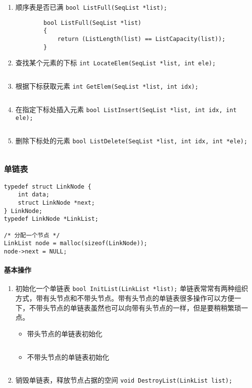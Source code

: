 \documentclass{ctexart}
\begin{document}
\begin{enumerate}
    \item 顺序表是否已满 \texttt{bool ListFull(SeqList *list);}
        \begin{verbatim}
        bool ListFull(SeqList *list)
        {
            return (ListLength(list) == ListCapacity(list));
        }
        \end{verbatim}

    \item 查找某个元素的下标 \texttt{int LocateElem(SeqList *list, int ele);}
        \inputminted{c}{codes/locate-element-in-static-list.c}

    \item 根据下标获取元素 \texttt{int GetElem(SeqList *list, int idx);}
        \inputminted{c}{codes/get-element-from-static-list.c}

    \item 在指定下标处插入元素 \texttt{bool ListInsert(SeqList *list, int idx, int ele);}
        \inputminted{c}{codes/static-list-insert.c}

    \item 删除下标处的元素 \texttt{bool ListDelete(SeqList *list, int idx, int *ele);}
        \inputminted{c}{codes/static-list-delete.c}
\end{enumerate}

\subsubsection{单链表}
\begin{verbatim}
typedef struct LinkNode {
    int data;
    struct LinkNode *next;
} LinkNode;
typedef LinkNode *LinkList;

/* 分配一个节点 */
LinkList node = malloc(sizeof(LinkNode));
node->next = NULL;
\end{verbatim}

\paragraph{基本操作}
\begin{enumerate}
    \item 初始化一个单链表 \texttt{bool InitList(LinkList *list);}
        单链表常常有两种组织方式，带有头节点和不带头节点。带有头节点的单链表很多操作可以方便一下，不带头节点的单链表虽然也可以向带有头节点的一样，但是要稍稍繁琐一点。
        \begin{itemize}
            \item 带头节点的单链表初始化
                \inputminted{c}{codes/init-link-list-with-dummy-node.c}
            \item 不带头节点的单链表初始化
                \inputminted{c}{codes/init-link-list-without-dummy-node.c}
        \end{itemize}

    \item 销毁单链表，释放节点占据的空间 \texttt{void DestroyList(LinkList list);}
        \inputminted{c}{codes/destroy-link-list.c}

\end{enumerate}
\end{document}
